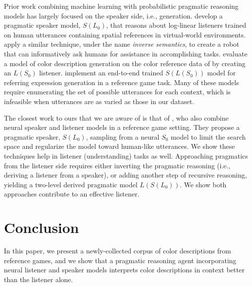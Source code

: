 \documentclass[11pt,letterpaper]{article}
\newcommand{\term}{\textit}
\newcommand{\Listener}{L}
\newcommand{\Speaker}{S}
\renewcommand{\|}{\mid}
\begin{document}
Prior work combining machine learning with probabilistic pragmatic reasoning
models has largely focused on the speaker side, i.e., generation.
 develop a pragmatic speaker model,
$\Speaker(\Listener_0)$, that reasons about log-linear listeners trained on human
utterances containing spatial references in virtual-world environments.
 apply a similar technique, under the name
\term{inverse semantics}, to create a robot that can informatively ask
humans for assistance in accomplishing tasks.
 evaluate a model of color description generation
\cite{McMahan2015} on the color
reference data of  by creating an $\Listener(\Speaker_0)$
listener.
 implement
an end-to-end trained $\Speaker(\Listener(\Speaker_0))$ model for referring
expression generation in a reference game task. Many of these models require
enumerating the set of possible utterances for each context, which is infeasible when
utterances are as varied as those in our dataset.

The closest work to ours that we are aware of is that of
, who also combine neural speaker
and listener models in a reference game setting. They propose a
pragmatic speaker, $\Speaker(\Listener_0)$, sampling from a neural
$\Speaker_0$ model to limit the search space and regularize the model toward
human-like utterances. We show these techniques help in
listener (understanding) tasks as well. Approaching pragmatics from the listener
side requires either inverting the pragmatic reasoning (i.e., deriving a
listener from a speaker), or adding another step of recursive reasoning,
yielding a two-level derived pragmatic model
$\Listener(\Speaker(\Listener_0))$. We show both approaches contribute
to an effective listener.

\section{Conclusion} \label{sec:conclusion}

In this paper, we present a newly-collected corpus of color descriptions from
reference games, and we show that a pragmatic reasoning agent
incorporating neural listener and speaker models
interprets color descriptions in context better than the listener alone.

\end{document}
